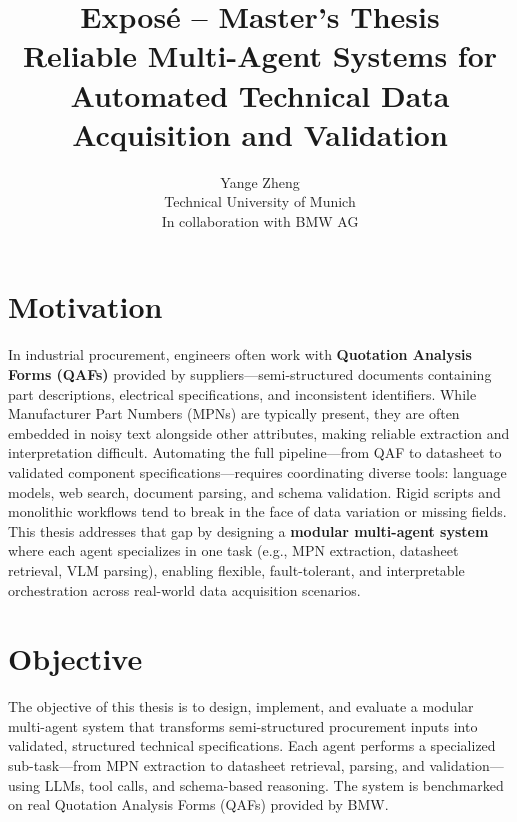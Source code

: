 \documentclass[11pt]{article}
\title{\textbf{Exposé – Master’s Thesis}\\Reliable Multi-Agent Systems for Automated Technical Data Acquisition and Validation}
\author{Yange Zheng\\Technical University of Munich\\In collaboration with BMW AG}
\date{}
\begin{document}
\maketitle

\section*{Motivation}
In industrial procurement, engineers often work with \textbf{Quotation Analysis Forms (QAFs)} provided by suppliers—semi-structured documents containing part descriptions, electrical specifications, and inconsistent identifiers. While Manufacturer Part Numbers (MPNs) are typically present, they are often embedded in noisy text alongside other attributes, making reliable extraction and interpretation difficult. Automating the full pipeline—from QAF to datasheet to validated component specifications—requires coordinating diverse tools: language models, web search, document parsing, and schema validation. Rigid scripts and monolithic workflows tend to break in the face of data variation or missing fields. This thesis addresses that gap by designing a \textbf{modular multi-agent system} where each agent specializes in one task (e.g., MPN extraction, datasheet retrieval, VLM parsing), enabling flexible, fault-tolerant, and interpretable orchestration across real-world data acquisition scenarios.

\section*{Objective}
The objective of this thesis is to design, implement, and evaluate a modular multi-agent system that transforms semi-structured procurement inputs into validated, structured technical specifications. Each agent performs a specialized sub-task—from MPN extraction to datasheet retrieval, parsing, and validation—using LLMs, tool calls, and schema-based reasoning. The system is benchmarked on real Quotation Analysis Forms (QAFs) provided by BMW.
\end{document}
